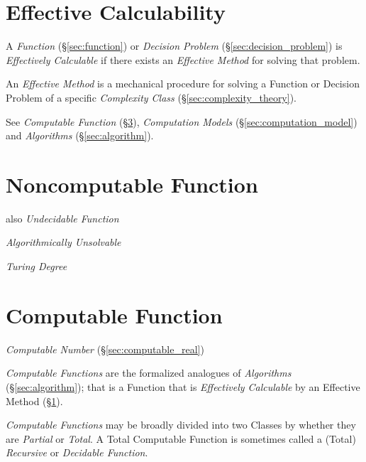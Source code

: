 \section{Effective Calculability}\label{sec:effective_method}

A \emph{Function} (\S\ref{sec:function}) or \emph{Decision
Problem} (\S\ref{sec:decision_problem}) is \emph{Effectively
Calculable} if there exists an \emph{Effective Method} for solving
that problem.

An \emph{Effective Method} is a mechanical procedure for solving a
Function or Decision Problem of a specific \emph{Complexity Class}
(\S\ref{sec:complexity_theory}).

See \emph{Computable Function} (\S\ref{sec:computable_function}),
\emph{Computation Models} (\S\ref{sec:computation_model}) and
\emph{Algorithms} (\S\ref{sec:algorithm}).



\section{Noncomputable Function}\label{sec:noncomputable_function}

also \emph{Undecidable Function}

\emph{Algorithmically Unsolvable}

\emph{Turing Degree}



\section{Computable Function}\label{sec:computable_function}

\emph{Computable Number} (\S\ref{sec:computable_real})

\emph{Computable Functions} are the formalized analogues of
\emph{Algorithms} (\S\ref{sec:algorithm}); that is a Function that
is \emph{Effectively Calculable} by an Effective Method
(\S\ref{sec:effective_method}).

\emph{Computable Functions} may be broadly divided into two Classes by
whether they are \emph{Partial} or \emph{Total}. A Total Computable
Function is sometimes called a (Total) \emph{Recursive} or
\emph{Decidable Function}.

